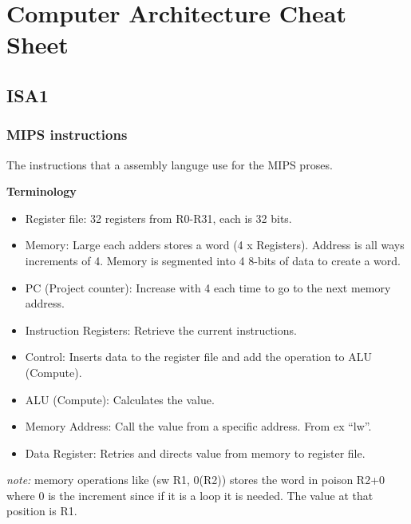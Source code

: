 \chapter{Computer Architecture Cheat Sheet}

\newpage

\section{ISA1}
\subsection{MIPS instructions}
The instructions that a assembly languge use for the MIPS proses.

\noindent\textbf{Terminology} \newline
\begin{itemize}
\item  Register file: 32 registers from R0-R31, each is 32 bits.
\item  Memory: Large each adders stores a word (4 x Registers). Address is all ways increments of 4.
       Memory is segmented into 4 8-bits of data to create a word.
\item  PC (Project counter): Increase with 4 each time to go to the next memory address.
\item  Instruction Registers: Retrieve the current instructions.
\item  Control: Inserts data to the register file and add the operation to ALU (Compute).
\item  ALU (Compute): Calculates the value.
\item  Memory Address: Call the value from a specific address. From ex ``lw''.
\item  Data Register: Retries and directs value from memory to register file.
\end{itemize}

\newpage
\emph{note:} memory operations like (sw R1, 0(R2)) stores the word in poison R2+0 where 0 is the increment
since if it is a loop it is needed. The value at that position is R1. 

